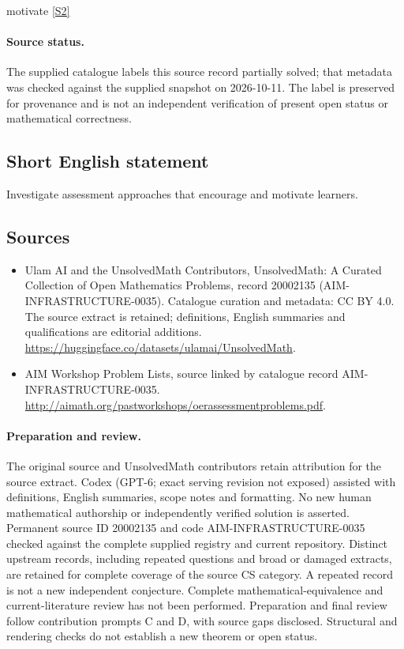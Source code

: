 \documentclass[11pt]{article}
\newcommand{\sref}[2]{\hyperlink{source:#1:#2}{[S#2]}}
\begin{document}
motivate \sref{20002135}{2}
\paragraph{Source status.}
The supplied catalogue labels this source record partially solved; that metadata was checked against the supplied snapshot on 2026-10-11. The label is preserved for provenance and is not an independent verification of present open status or mathematical correctness.
\subsection{Short English statement}
Investigate assessment approaches that encourage and motivate learners.
\subsection{Sources}
\begin{itemize}
\item[\hypertarget{source:20002135:1}{S1}] Ulam AI and the UnsolvedMath Contributors, UnsolvedMath: A Curated Collection of Open Mathematics Problems, record 20002135 (AIM-INFRASTRUCTURE-0035). Catalogue curation and metadata: CC BY 4.0. The source extract is retained; definitions, English summaries and qualifications are editorial additions.
\url{https://huggingface.co/datasets/ulamai/UnsolvedMath}.
\item[\hypertarget{source:20002135:2}{S2}] AIM Workshop Problem Lists, source linked by catalogue record AIM-INFRASTRUCTURE-0035.
\url{http://aimath.org/pastworkshops/oerassessmentproblems.pdf}.
\end{itemize}
\paragraph{Preparation and review.}
The original source and UnsolvedMath contributors retain attribution for the source extract. Codex (GPT-6; exact serving revision not exposed) assisted with definitions, English summaries, scope notes and formatting. No new human mathematical authorship or independently verified solution is asserted. Permanent source ID 20002135 and code AIM-INFRASTRUCTURE-0035 checked against the complete supplied registry and current repository. Distinct upstream records, including repeated questions and broad or damaged extracts, are retained for complete coverage of the source CS category. A repeated record is not a new independent conjecture. Complete mathematical-equivalence and current-literature review has not been performed. Preparation and final review follow contribution prompts C and D, with source gaps disclosed. Structural and rendering checks do not establish a new theorem or open status.
\label{end:20002135}
\end{document}
